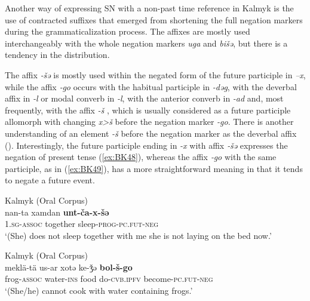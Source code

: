 \documentclass[output=paper]{langsci/langscibook}
\begin{document}
Another way of expressing SN with a non-past time reference in Kalmyk is the use of contracted suffixes that emerged from shortening the full negation markers during the grammaticalization process. The affixes are mostly used interchangeably with the whole negation markers \textit{uga} and \textit{bišǝ}, but there is a tendency in the distribution.

The affix \textit{‑šǝ} is mostly used within the negated form of the future participle in \textit{–x}, while the affix \textit{‑go} occurs with the habitual participle in \textit{-dǝg}, with the deverbal affix in \textit{-l} or modal converb in \textit{-l}, with the anterior converb in \textit{-ad} and, most frequently, with the affix \textit{-š} \citep[13]{baranova2018a}, which is usually considered as a future participle allomorph with changing \textit{x>š} before the negation marker \textit{-go}. There is another understanding of an element \textit{-š} before the negation marker as the deverbal affix (\citeauthor[in preparation]{brosig-a}). Interestingly, the future participle ending in \textit{-x} with affix \textit{‑šǝ} expresses the negation of present tense (\ref{ex:BK48}), whereas the affix \textit{‑go} with the same participle, as in (\ref{ex:BK49}), has a more straightforward meaning in that it tends to negate a future event.

\ea Kalmyk (Oral Corpus) \label{ex:BK48}\\
	\gll nan-ta			xamdan	\textbf{unt-ča-x-šǝ}\\
	1.\textsc{sg-assoc}	together	sleep-\textsc{prog-pc.fut-neg}\\
	\glt `(She) does not sleep together with me {she is not laying on the bed now}.'
\z

\ea Kalmyk (Oral Corpus) \label{ex:BK49}\\
	\gll meklä-tä		us-ar			xotǝ	ke-ǯǝ	\textbf{bol-š-go}\\
	frog-\textsc{assoc}	water-\textsc{ins}	food	do-\textsc{cvb.ipfv}	become-\textsc{pc.fut-neg}\\
	\glt `(She/he) cannot cook with water containing frogs.'
\z
\end{document}
